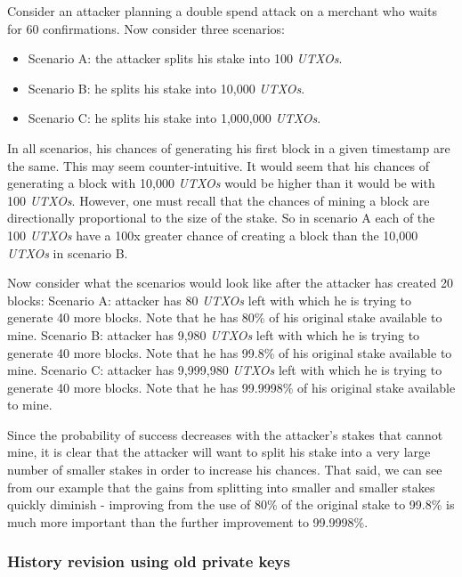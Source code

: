 \documentclass[a4paper,11pt]{article}
\begin{document}
\newpage
Consider an attacker planning a double spend attack on a merchant who waits for 60 confirmations. Now consider three scenarios:
\begin{itemize}
\setlength{\itemsep}{0pt}
\item{Scenario A: the attacker splits his stake into 100 \textit{UTXOs}.}
\item{Scenario B: he splits his stake into 10,000 \textit{UTXOs}.}
\item{Scenario C: he splits his stake into 1,000,000 \textit{UTXOs}.}
\end{itemize}

In all scenarios, his chances of generating his first block in a given timestamp are the same. This may seem counter-intuitive. It would seem that his chances of generating a block with 10,000 \textit{UTXOs} would be higher than it would be with 100 \textit{UTXOs}. However, one must recall that the chances of mining a block are directionally proportional to the size of the stake. So in scenario A each of the 100 \textit{UTXOs} have a 100x greater chance of creating a block than the 10,000 \textit{UTXOs} in scenario B.

Now consider what the scenarios would look like after the attacker has created 20 blocks:
Scenario A: attacker has 80 \textit{UTXOs} left with which he is trying to generate 40 more blocks. Note that he has 80\% of his original stake available to mine.
Scenario B: attacker has 9,980 \textit{UTXOs} left with which he is trying to generate 40 more blocks.
Note that he has 99.8\% of his original stake available to mine.
Scenario C: attacker has 9,999,980 \textit{UTXOs} left with which he is trying to generate 40 more blocks. Note that he has 99.9998\% of his original stake available to mine.

Since the probability of success decreases with the attacker's stakes that cannot mine, it is clear that the attacker will want to split his stake into a very large number of smaller stakes in order to increase his chances. That said, we can see from our example that the gains from splitting into smaller and smaller stakes quickly diminish - improving from the use of 80\% of the original stake to 99.8\% is much more important than the further improvement to 99.9998\%.

\subsubsection{History revision using old private keys}
\label{332}
\end{document}
